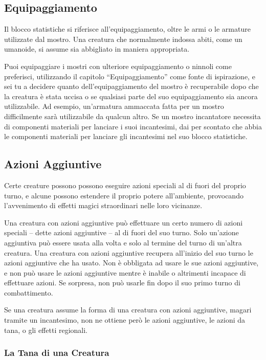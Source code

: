 \subsection{Equipaggiamento}

Il blocco statistiche si riferisce all'equipaggiamento, oltre le armi o
le armature utilizzate dal mostro. Una creatura che normalmente indossa
abiti, come un umanoide, si assume sia abbigliato in maniera
appropriata.

Puoi equipaggiare i mostri con ulteriore equipaggiamento o ninnoli come
preferisci, utilizzando il capitolo ``Equipaggiamento'' come fonte di
ispirazione, e sei tu a decidere quanto dell'equipaggiamento del mostro
è recuperabile dopo che la creatura è stata uccisa o se qualsiasi parte
del suo equipaggiamento sia ancora utilizzabile. Ad esempio, un'armatura
ammaccata fatta per un mostro difficilmente sarà utilizzabile da qualcun altro.  Se un mostro incantatore necessita di componenti  materiali per lanciare i suoi incantesimi, dai per  scontato che abbia le componenti materiali per lanciare  gli incantesimi nel suo blocco statistiche.

\subsection{Azioni Aggiuntive}

Certe creature possono  possono eseguire azioni speciali al di fuori del proprio  turno, e alcune possono estendere il proprio potere  all'ambiente, provocando l'avvenimento di effetti magici  straordinari nelle loro vicinanze.

Una creatura con azioni aggiuntive può effettuare un certo  numero di azioni speciali -- dette azioni aggiuntive -- al  di fuori del suo turno. Solo un'azione aggiuntiva può  essere usata alla volta e solo al termine del turno di  un'altra creatura. Una creatura con azioni aggiuntive recupera  all'inizio del suo turno le azioni aggiuntive che ha  usato. Non è obbligata ad usare le sue azioni aggiuntive, e non può usare le azioni aggiuntive mentre è inabile o altrimenti incapace di effettuare  azioni. Se sorpresa, non può usarle fin dopo il suo  primo turno di combattimento.

Se una creatura assume la forma di una creatura con azioni aggiuntive, magari tramite un incantesimo, non ne  ottiene però le azioni aggiuntive, le azioni da tana, o  gli effetti regionali.

\subsubsection{La Tana di una Creatura}

